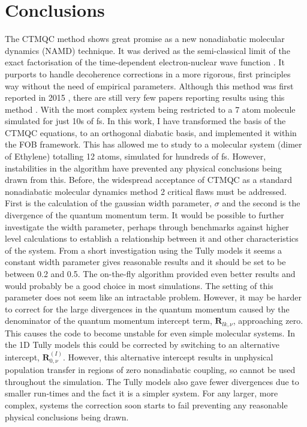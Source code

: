 \section{Conclusions}
The CTMQC method shows great promise as a new nonadiabatic molecular dynamics (NAMD) technique. It was derived as the semi-classical limit of the exact factorisation of the time-dependent electron-nuclear wave function \cite{abedi_exact_2010, agostini_semiclassical_2015}. It purports to handle decoherence corrections in a more rigorous, first principles way without the need of empirical parameters. Although this method was first reported in 2015 \cite{agostini_semiclassical_2015}, there are still very few papers reporting results using this method \cite{min_ab_2017, gossel_coupled-trajectory_2018,agostini_semiclassical_2015}. With the most complex system being restricted to a 7 atom molecule simulated for just 10s of fs\cite{min_ab_2017}. In this work, I have transformed the basis of the CTMQC equations, to an orthogonal diabatic basis, and implemented it within the FOB framework. This has allowed me to study to a molecular system (dimer of Ethylene) totalling 12 atoms, simulated for hundreds of fs. However, instabilities in the algorithm have prevented any physical conclusions being drawn from this. Before, the widespread acceptance of CTMQC as a standard nonadiabatic molecular dynamics method 2 critical flaws must be addressed. First is the calculation of the gaussian width parameter, $\sigma$ and the second is the divergence of the quantum momentum term. It would be possible to further investigate the width parameter, perhaps through benchmarks against higher level calculations to establish a relationship between it and other characteristics of the system. From a short investigation using the Tully models it seems a constant width parameter gives reasonable results and it should be set to be between 0.2 and 0.5. The on-the-fly algorithm provided even better results and would probably be a good choice in most simulations. The setting of this parameter does not seem like an intractable problem. However, it may be harder to correct for the large divergences in the quantum momentum caused by the denominator of the quantum momentum intercept term, $\mathbf{R}_{lk, \nu}$, approaching zero. This causes the code to become unstable for even simple molecular systems. In the 1D Tully models this could be corrected by switching to an alternative intercept, $\mathbf{R}_{0, \nu}^{(I)}$. However, this alternative intercept results in unphysical population transfer in regions of zero nonadiabatic coupling, so cannot be used throughout the simulation. The Tully models also gave fewer divergences due to smaller run-times and the fact it is a simpler system. For any larger, more complex, systems the correction soon starts to fail preventing any reasonable physical conclusions being drawn.
